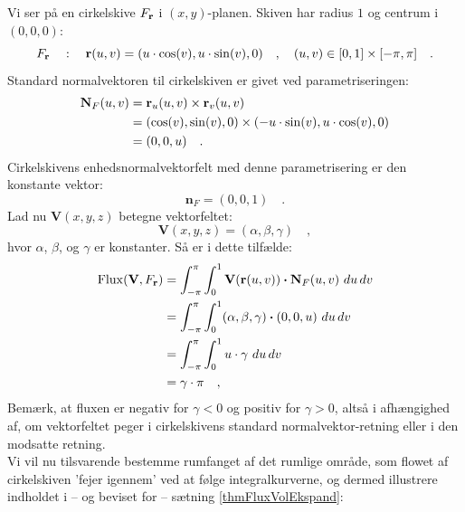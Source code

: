 \begin{example} \label{exampFlowSkive1}
Vi ser på en cirkelskive $F_{\bf r}$ i $(x,y)$-planen. Skiven har  radius $1$ og centrum i $(0,0,0)$:
\begin{equation}
F_{\bf r} \quad : \quad {\bf r}(u,v) = (u\cdot \cos(v), u\cdot \sin(v), 0) \quad , \quad  (u,v) \in [0,1]\times [-\pi, \pi] \quad .
\end{equation}
Standard normalvektoren til cirkelskiven er givet ved parametriseringen:
\begin{equation}
\begin{aligned}
\mathbf{N}_{F}(u,v) &= {\bf r}_{u}(u,v) \times {\bf r}_{v}(u,v) \\
&= ( \cos(v), \sin(v), 0) \times (-u\cdot \sin(v), u \cdot \cos(v), 0  ) \\
&= (0,0,u) \quad .
\end{aligned}
\end{equation}
Cirkelskivens enhedsnormalvektorfelt med denne parametrisering er  den konstante vektor:
\begin{equation}
{\mathbf{n}}_{F} = (0,0,1) \quad .
\end{equation}
Lad nu $\mathbf{V}(x,y,z)$ betegne vektorfeltet:
\begin{equation}
\mathbf{V}(x,y,z) = (\alpha, \beta, \gamma) \quad ,
\end{equation}
hvor $\alpha$, $\beta$, og $\gamma$ er konstanter.
Så er i dette tilfælde:
\begin{equation}
\begin{aligned}
\operatorname{Flux}(\mathbf{V}, F_{\bf r}) &= \int_{-\pi}^{\pi} \int_{0}^{1} \mathbf{V}(\mathbf{r}(u,v)) \bm{\cdot} \mathbf{N}_{F}(u,v) \, \, du \, dv \\
&= \int_{-\pi}^{\pi} \int_{0}^{1} (\alpha, \beta, \gamma) \bm{\cdot} ( 0,0,u) \,\, du \, dv \\
&= \int_{-\pi}^{\pi} \int_{0}^{1} u \cdot \gamma \,\, du \, dv \\
&= \gamma \cdot \pi \quad ,
\end{aligned}
\end{equation}
Bemærk, at fluxen er negativ for $\gamma <0$ og positiv for $\gamma>0$, altså i afhængighed af, om vektorfeltet peger i cirkelskivens standard normalvektor-retning eller i den modsatte retning.\\

Vi vil nu tilsvarende bestemme rumfanget af det rumlige område, som flowet af cirkelskiven 'fejer igennem' ved at følge integralkurverne, og dermed illustrere indholdet i -- og beviset for --
sætning \ref{thmFluxVolEkspand}: \\


\end{example}
